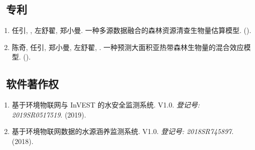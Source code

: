 \subsection*{\texorpdfstring{\faBook\ 专利}{专利}}
\begin{enumerate}
\item
     任引, {}, 左舒翟, 郑小曼.
     一种多源数据融合的森林资源清查生物量估算模型.
     ({}).
\item
     陈奇, 任引, 郑小曼, 左舒翟, {}.
     一种预测大面积亚热带森林生物量的混合效应模型.
     ({}).
\end{enumerate}

\subsection*{\texorpdfstring{\faBook\ 软件著作权}{软件著作权}}
\begin{enumerate}
\item
   基于环境物联网与 InVEST 的水安全监测系统. V1.0.
    \textit{登记号: 2019SR0517519}. (2019).
\item
    基于环境物联网数据的水源涵养监测系统. V1.0.
    \textit{登记号: 2018SR745897}. (2018).
\end{enumerate}